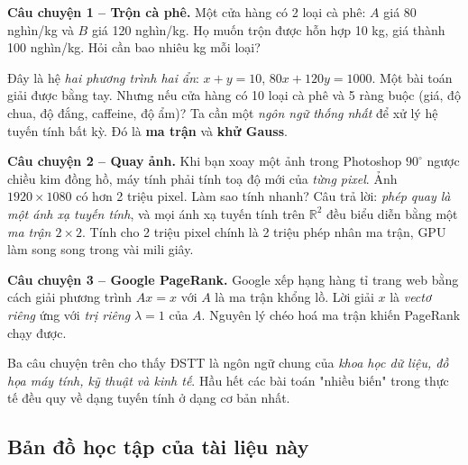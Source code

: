 \documentclass[12pt,a4paper]{article}
\begin{document}
\begin{dongco}[title={Động cơ học -- Ba câu hỏi thực tế}]
\textbf{Câu chuyện 1 -- Trộn cà phê.} Một cửa hàng có 2 loại cà phê: $A$ giá 80 nghìn/kg và $B$ giá 120 nghìn/kg. Họ muốn trộn được hỗn hợp 10 kg, giá thành 100 nghìn/kg. Hỏi cần bao nhiêu kg mỗi loại?

Đây là hệ \emph{hai phương trình hai ẩn}: $x + y = 10$, $80x + 120y = 1000$. Một bài toán giải được bằng tay. Nhưng nếu cửa hàng có 10 loại cà phê và 5 ràng buộc (giá, độ chua, độ đắng, caffeine, độ ẩm)? Ta cần một \emph{ngôn ngữ thống nhất} để xử lý hệ tuyến tính bất kỳ. Đó là \textbf{ma trận} và \textbf{khử Gauss}.

\medskip
\textbf{Câu chuyện 2 -- Quay ảnh.} Khi bạn xoay một ảnh trong Photoshop $90^\circ$ ngược chiều kim đồng hồ, máy tính phải tính toạ độ mới của \emph{từng pixel}. Ảnh $1920 \times 1080$ có hơn 2 triệu pixel. Làm sao tính nhanh? Câu trả lời: \emph{phép quay là một ánh xạ tuyến tính}, và mọi ánh xạ tuyến tính trên $\mathbb{R}^2$ đều biểu diễn bằng một \emph{ma trận $2 \times 2$}. Tính cho 2 triệu pixel chính là 2 triệu phép nhân ma trận, GPU làm song song trong vài mili giây.

\medskip
\textbf{Câu chuyện 3 -- Google PageRank.} Google xếp hạng hàng tỉ trang web bằng cách giải phương trình $Ax = x$ với $A$ là ma trận khổng lồ. Lời giải $x$ là \emph{vectơ riêng} ứng với \emph{trị riêng} $\lambda = 1$ của $A$. Nguyên lý chéo hoá ma trận khiến PageRank chạy được.

\medskip
Ba câu chuyện trên cho thấy ĐSTT là ngôn ngữ chung của \emph{khoa học dữ liệu, đồ họa máy tính, kỹ thuật và kinh tế}. Hầu hết các bài toán "nhiều biến" trong thực tế đều quy về dạng tuyến tính ở dạng cơ bản nhất.
\end{dongco}

\subsection{Bản đồ học tập của tài liệu này}
\end{document}
